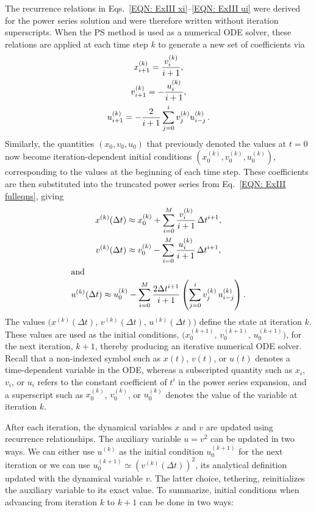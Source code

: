 \documentclass[draft]{agujournal2019}
\begin{document}
The recurrence relations in Eqs.~\eqref{EQN: ExIII xi}--\eqref{EQN: ExIII ui} were derived for the power series solution and were therefore written without iteration superscripts. When the PS method is used as a numerical ODE solver, these relations are applied at each time step $k$ to generate a new set of coefficients via
    \begin{gather}
        x_{i+1}^{(k)}=\frac{v_i^{(k)}}{i+1}, \label{eqn:EXIII xi ODE solver} \\
        v_{i+1}^{(k)}=-\frac{u_i^{(k)}}{i+1}, \label{eqn:EXIII vi ODE solver} \\
        u_{i+1}^{(k)}=-\frac{2}{i+1}\sum_{j=0}^i v_j^{(k)}u_{i-j}^{(k)}\label{eqn:EXIII ui ODE solver}\thinspace.
    \end{gather}
Similarly, the quantities $(x_{0},v_{0},u_{0})$ that previously denoted the values at $t=0$ now become iteration-dependent initial conditions $(x_{0}^{(k)},v_{0}^{(k)},u_{0}^{(k)})$, corresponding to the values at the beginning of each time step. These coefficients are then substituted into the truncated power series from Eq.~\eqref{EQN: ExIII fulleqns}, giving
       \begin{gather}
        x^{(k)}(\Delta t) \approx x_0^{(k)} + \sum_{i=0}^{M} \frac{v_i^{(k)}}{i+1}\,\Delta t^{i+1}, \label{eqn:EXIII x ODE solver}\\
        v^{(k)}(\Delta t) \approx v_0^{(k)} - \sum_{i=0}^{M} \frac{u_i^{(k)}}{i+1}\,\Delta t^{i+1}, \label{eqn:EXIII v ODE solver}\\
\intertext{and}
        u^{(k)}(\Delta t) \approx u_0^{(k)} - \sum_{i=0}^{M} \frac{2\Delta t^{i+1}}{i+1}
        \left(\sum_{j=0}^{i} v_j^{(k)}\,u_{i-j}^{(k)}\right).\label{eqn:EXIII u ODE solver}
    \end{gather}
The values $\big(x^{(k)}(\Delta t),\,v^{(k)}(\Delta t),\,u^{(k)}(\Delta t)\big)$ define the state at iteration $k$. These values are used as the initial conditions, $\big(x_0^{(k+1)},\, v_0^{(k+1)}, \,u_0^{(k+1)}\big)$, for the next iteration, $k+1$, thereby producing an iterative numerical ODE solver. Recall that a non-indexed symbol such as $x(t)$, $v(t)$, or $u(t)$  denotes a time-dependent variable in the ODE, whereas a subscripted quantity  such as $x_i$, $v_i$, or $u_i$ refers to the constant coefficient of $t^i$ in the power series expansion, and a superscript such as $x_0^{(k)}$, $v_0^{(k)}$, or $u_0^{(k)}$
denotes the value of the variable at iteration $k$.

After each iteration, the dynamical variables $x$ and $v$ are updated using recurrence relationships. The auxiliary variable $u=v^2$ can be updated in two ways. We can either use $u^{(k)}$ as the initial condition $u_0^{(k+1)}$ for the next iteration or we can use $u_0^{(k+1)}\simeq(v^{(k)}(\Delta t ))^2$, its analytical definition updated with the dynamical variable $v$. The latter choice, tethering, reinitializes the auxiliary variable to its exact value. To summarize, initial conditions when advancing from iteration $k$ to $k+1$ can be done in two ways:\\
\end{document}
